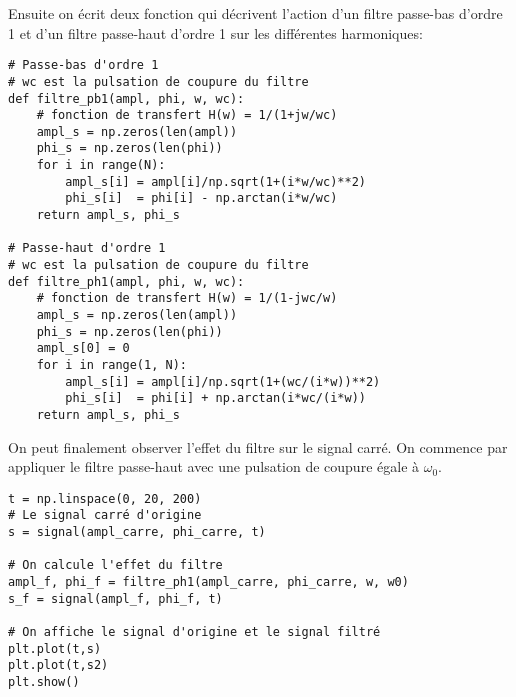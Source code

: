 \documentclass{cours}
\begin{document}
Ensuite on écrit deux fonction qui décrivent l'action d'un filtre passe-bas d'ordre 1 et d'un filtre passe-haut d'ordre 1 sur les différentes harmoniques:
\begin{verbatim}
# Passe-bas d'ordre 1
# wc est la pulsation de coupure du filtre
def filtre_pb1(ampl, phi, w, wc):
    # fonction de transfert H(w) = 1/(1+jw/wc)
    ampl_s = np.zeros(len(ampl))
    phi_s = np.zeros(len(phi))
    for i in range(N):
        ampl_s[i] = ampl[i]/np.sqrt(1+(i*w/wc)**2)
        phi_s[i]  = phi[i] - np.arctan(i*w/wc)
    return ampl_s, phi_s

# Passe-haut d'ordre 1
# wc est la pulsation de coupure du filtre
def filtre_ph1(ampl, phi, w, wc):
    # fonction de transfert H(w) = 1/(1-jwc/w)
    ampl_s = np.zeros(len(ampl))
    phi_s = np.zeros(len(phi))
    ampl_s[0] = 0
    for i in range(1, N):
        ampl_s[i] = ampl[i]/np.sqrt(1+(wc/(i*w))**2)
        phi_s[i]  = phi[i] + np.arctan(i*wc/(i*w))
    return ampl_s, phi_s
\end{verbatim}

On peut finalement observer l'effet du filtre sur le signal carré. On commence par appliquer le filtre passe-haut avec une pulsation de coupure égale à $\omega_0$. 

\begin{verbatim}
t = np.linspace(0, 20, 200)
# Le signal carré d'origine
s = signal(ampl_carre, phi_carre, t)

# On calcule l'effet du filtre
ampl_f, phi_f = filtre_ph1(ampl_carre, phi_carre, w, w0)
s_f = signal(ampl_f, phi_f, t)

# On affiche le signal d'origine et le signal filtré
plt.plot(t,s)
plt.plot(t,s2)
plt.show()
\end{verbatim}
\end{document}
